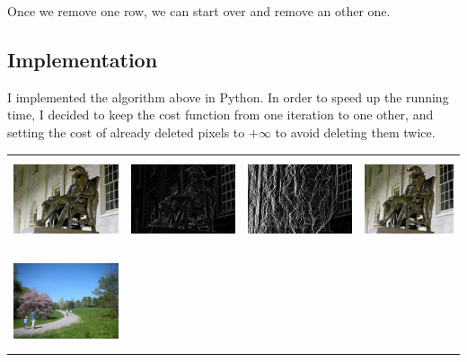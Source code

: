 \documentclass[a4paper]{article}
\begin{document}
  Once we remove one row, we can start over and remove an other one.
  
  \subsection{Implementation}
  
  I implemented the algorithm above in Python. In order to speed up the running time, I decided to keep the cost function from one iteration to one other, and setting the cost of already deleted pixels to $+\infty$ to avoid deleting them twice.
  
  \begin{center}
  \begin{tabular}{cccc}
  \includegraphics[height=2.5cm]{results_seamcarving/1/image_input.png} &
  \includegraphics[height=2.5cm]{results_seamcarving/1/cost_init.png} &
  \includegraphics[height=2.5cm]{results_seamcarving/1/cost_remove.png} &
  \includegraphics[height=2.5cm]{results_seamcarving/1/image_output.png} \\\\
  \includegraphics[height=2.7cm]{results_seamcarving/2/image_input.png} &

\end{tabular}
\end{center}
\end{document}
